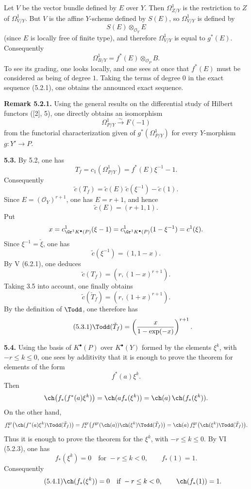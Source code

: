 Let \(V\) be the vector bundle defined by \(E\) over \(Y\). Then \(\Omega^1_{Z/Y}\) is the restriction to \(Z\) of \(\Omega^1_{V/Y}\). But \(V\) is the affine \(Y\)-scheme defined by \(S(E)\), so \(\Omega^1_{V/Y}\) is defined by
\[
S(E)\otimes_{\mathcal O_Y}E
\]
(since \(E\) is locally free of finite type), and therefore \(\Omega^1_{V/Y}\) is equal to \(g^*(E)\). Consequently
\[
\Omega^1_{B/Y}=f^*(E)\otimes_{\mathcal O_P}B.
\]
To see its grading, one looks locally, and one sees at once that \(f^*(E)\) must be considered as being of degree \(1\). Taking the terms of degree \(0\) in the exact sequence (5.2.1), one obtains the announced exact sequence.

\textbf{Remark 5.2.1.} Using the general results on the differential study of Hilbert functors ([2], 5), one directly obtains an isomorphism
\[
\Omega^1_{P/Y}\xrightarrow{\sim}F(-1)
\]
from the functorial characterization given of \(g^*(\Omega^1_{P/Y})\) for every \(Y\)-morphism \(g:Y'\to P\).

\textbf{5.3.} By 5.2, one has
\[
 T_f=c_1(\Omega^1_{P/Y})=f^*(E)\xi^{-1}-1.
\]
Consequently
\[
 \widetilde c(T_f)=\widetilde c(E)\,\widetilde c(\xi^{-1})-\widetilde c(1).
\]
Since \(E=(\mathcal O_Y)^{r+1}\), one has \(E=r+1\), and hence
\[
 \widetilde c(E)=(r+1,1).
\]
Put
\[
 x=c^1_{\Gr^1K^{\bullet}(P)}(\xi-1)
 =
 c^1_{\Gr^1K^{\bullet}(P)}(1-\xi^{-1})
 =
 c^1(\xi).
\]
Since \(\xi^{-1}=\check \xi\), one has
\[
 \widetilde c(\xi^{-1})=(1,1-x).
\]
By V (6.2.1), one deduces
\[
 \widetilde c(T_f)=(r,(1-x)^{r+1}).
\]
Taking 3.5 into account, one finally obtains
\[
 \widetilde c(\check T_f)=(r,(1+x)^{r+1}).
\]
By the definition of \(\Todd\), one therefore has
\begin{equation}\tag{5.3.1}
 \Todd(\check T_f)=
 \left(\frac{x}{1-\exp(-x)}\right)^{r+1}.
\end{equation}

\textbf{5.4.} Using the basis of \(K^{\bullet}(P)\) over \(K^{\bullet}(Y)\) formed by the elements \(\xi^k\), with \(-r\leq k\leq0\), one sees by additivity that it is enough to prove the theorem for elements of the form
\[
 f^*(a)\xi^k .
\]
Then
\[
 \ch\bigl(f_*(f^*(a)\xi^k)\bigr)
 =
 \ch(a f_*(\xi^k))
 =
 \ch(a)\,\ch(f_*(\xi^k)).
\]
On the other hand,
\[
 f^{\mathrm{gr}}_*\bigl(\ch(f^*(a)\xi^k)\Todd(\check T_f)\bigr)
 =
 f^{\mathrm{gr}}_*\bigl(f^{\mathrm{gr}}(\ch(a))\ch(\xi^k)\Todd(\check T_f)\bigr)
 =
 \ch(a)\,f^{\mathrm{gr}}_*\bigl(\ch(\xi^k)\Todd(\check T_f)\bigr).
\]
Thus it is enough to prove the theorem for the \(\xi^k\), with \(-r\leq k\leq0\). By VI (5.2.3), one has
\[
 f_*(\xi^k)=0\quad\text{for }-r\leq k<0,\qquad f_*(1)=1.
\]
Consequently
\begin{equation}\tag{5.4.1}
 \ch(f_*(\xi^k))=0\quad\text{if }-r\leq k<0,\qquad
 \ch(f_*(1))=1.
\end{equation}

